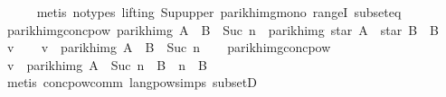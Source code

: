 \begin{isabellebody}
\ \ \ \ \isamarkupfalse%
\ {\isacharparenleft}{\kern0pt}metis\ {\isacharparenleft}{\kern0pt}no{\isacharunderscore}{\kern0pt}types{\isacharcomma}{\kern0pt}\ lifting{\isacharparenright}{\kern0pt}\ Sup{\isacharunderscore}{\kern0pt}upper\ parikh{\isacharunderscore}{\kern0pt}img{\isacharunderscore}{\kern0pt}mono\ rangeI\ subset{\isacharunderscore}{\kern0pt}eq{\isacharparenright}{\kern0pt}\isanewline
{}\isamarkupfalse%
%
\endisatagproof
{\isafoldproof}%
%
\isadelimproof
\isanewline
%
\endisadelimproof
\isanewline
{}\isamarkupfalse%
\ parikh{\isacharunderscore}{\kern0pt}img{\isacharunderscore}{\kern0pt}conc{\isacharunderscore}{\kern0pt}pow{}{\isacharcolon}{\kern0pt}\ {\isachardoublequoteopen}parikh{\isacharunderscore}{\kern0pt}img\ {\isacharparenleft}{\kern0pt}{\isacharparenleft}{\kern0pt}A\ {\isacharat}{\kern0pt}{\isacharat}{\kern0pt}\ B{\isacharparenright}{\kern0pt}\ {\isacharcircum}{\kern0pt}{\isacharcircum}{\kern0pt}\ Suc\ n{\isacharparenright}{\kern0pt}\ {\isasymsubseteq}\ parikh{\isacharunderscore}{\kern0pt}img\ {\isacharparenleft}{\kern0pt}star\ A\ {\isacharat}{\kern0pt}{\isacharat}{\kern0pt}\ star\ B\ {\isacharat}{\kern0pt}{\isacharat}{\kern0pt}\ B{\isacharparenright}{\kern0pt}{\isachardoublequoteclose}\isanewline
%
\isadelimproof
%
\endisadelimproof
%
\isatagproof
{}\isamarkupfalse%
\isanewline
\ \ \isamarkupfalse%
\ v\isanewline
\ \ \isamarkupfalse%
\ {\isachardoublequoteopen}v\ {\isasymin}\ parikh{\isacharunderscore}{\kern0pt}img\ {\isacharparenleft}{\kern0pt}{\isacharparenleft}{\kern0pt}A\ {\isacharat}{\kern0pt}{\isacharat}{\kern0pt}\ B{\isacharparenright}{\kern0pt}\ {\isacharcircum}{\kern0pt}{\isacharcircum}{\kern0pt}\ Suc\ n{\isacharparenright}{\kern0pt}{\isachardoublequoteclose}\isanewline
\ \ \isamarkupfalse%
\ parikh{\isacharunderscore}{\kern0pt}img{\isacharunderscore}{\kern0pt}conc{\isacharunderscore}{\kern0pt}pow\ \isamarkupfalse%
\ {\isachardoublequoteopen}v\ {\isasymin}\ parikh{\isacharunderscore}{\kern0pt}img\ {\isacharparenleft}{\kern0pt}A\ {\isacharcircum}{\kern0pt}{\isacharcircum}{\kern0pt}\ Suc\ n\ {\isacharat}{\kern0pt}{\isacharat}{\kern0pt}\ B\ {\isacharcircum}{\kern0pt}{\isacharcircum}{\kern0pt}\ n\ {\isacharat}{\kern0pt}{\isacharat}{\kern0pt}\ B{\isacharparenright}{\kern0pt}{\isachardoublequoteclose}\isanewline
\ \ \ \ \isamarkupfalse%
\ {\isacharparenleft}{\kern0pt}metis\ conc{\isacharunderscore}{\kern0pt}pow{\isacharunderscore}{\kern0pt}comm\ lang{\isacharunderscore}{\kern0pt}pow{\isachardot}{\kern0pt}simps{\isacharparenleft}{\kern0pt}{}{\isacharparenright}{\kern0pt}\ subsetD{\isacharparenright}{\kern0pt}\isanewline

\end{isabellebody}
